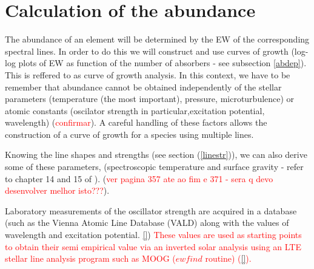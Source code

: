 \documentclass[dvips,12pt,a4paper]{report}
\begin{document}
{%




\section{Calculation of the abundance}
\label{calab}
The abundance of an element will be determined by the EW of the corresponding spectral lines. In order to do this we will construct and use curves of growth (log-log plots of EW as function of the number of absorbers - see subsection \ref{abdep}). This is reffered to as curve of growth analysis. In this context, we have to be remember that abundance cannot be obtained independently of the stellar parameters (temperature (the most important), pressure, microturbulence) or atomic constants (oscilator strength in particular,excitation potential, wavelength) (\textcolor{red}{confirmar}). A careful handling of these factors allows the construction of a curve of growth for a species using multiple lines. %

Knowing the line shapes and strengths (see section (\ref{linestr})), we can also derive some of these parameters, (spectroscopic temperature and surface gravity - refer to chapter 14 and 15 of \citet{Gray-2005}). (\textcolor{red}{ver pagina 357 ate ao fim e 371 - sera q devo desenvolver melhor isto???}).

Laboratory measurements of the oscillator strength are acquired in a database (such as the Vienna Atomic Line Database (VALD) along with the values of wavelength and excitation potential.  \ref{}) \textcolor{red}{These values are used as starting points to obtain their semi empirical value via an inverted solar analysis using an LTE stellar line analysis program such as MOOG ($ewfind$ routine) (\ref{}).}

}
\end{document}
